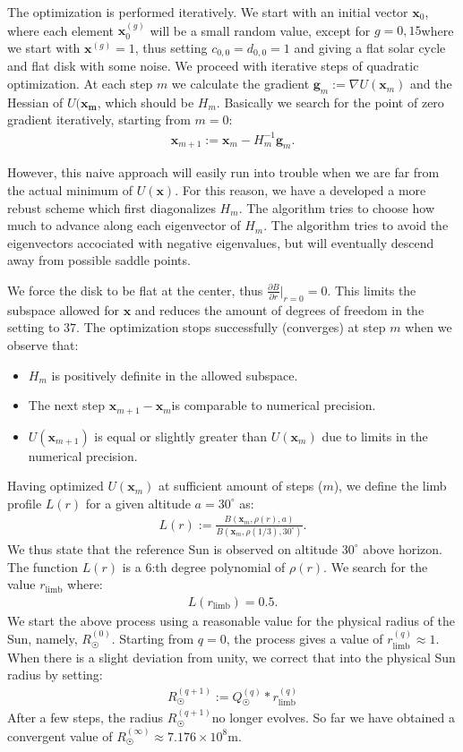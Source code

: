 \documentclass{aa}
\newcommand{\eqnl}[2]{\begin{eqnarray}\label{#1}#2\end{eqnarray}}
\newcommand{\s}[2]{{#1}_{\mathrm{#2}}}
\begin{document}
  The optimization is performed iteratively. We start with an initial vector $\bm{x}_0$, where each element 
  $\bm{x}_0^{(g)}$ will be a small random value, except for $g=0,15$where we start with $\bm{x}^{(g)} = 1$, thus 
  setting $c_{0,0} = d_{0,0} = 1$ and giving a flat solar cycle and flat disk with some noise. We proceed with iterative 
  steps of quadratic optimization. At each step $m$ we calculate the gradient $\bm{g}_m := \nabla U(\bm{x}_m)$ and the Hessian of $U(\bm{x_m}$, which should be $H_m$. Basically we search for the point of zero gradient iteratively, starting from $m=0$:
  \eqnl{physical_radius_step}{
  \bm{x}_{m+1} := \bm{x}_m - H_m^{-1} \bm{g}_m \text{.}
  }

  However, this naive approach will easily run into trouble when we are far from the actual minimum of $U(\bm{x})$. For 
  this reason, we have a developed a more rebust scheme which first diagonalizes $H_m$. The algorithm tries to choose 
  how much to advance along each eigenvector of $H_m$. The algorithm tries to avoid the eigenvectors accociated with 
  negative eigenvalues, but will eventually descend away from possible saddle points.
  
  We force the disk to be flat at the center, thus $\frac{\partial B}{\partial r}\big|_{r=0} = 0$. This limits the 
  subspace allowed for $\bm{x}$ and reduces the amount of degrees of freedom in the setting to $37$. The optimization stops successfully (converges) at step $m$ when we observe that:
  \begin{itemize}
  \item $H_m$ is positively definite in the allowed subspace.
  \item The next step $\bm{x}_{m+1} - \bm{x}_{m}$is comparable to numerical precision.
  \item $U(\bm{x}_{m+1})$ is equal or slightly greater than $U(\bm{x}_m)$ due to limits in the numerical precision.
  \end{itemize}

  Having optimized $U(\bm{x}_{m})$ at sufficient amount of steps ($m$), we define the limb profile $L(r)$ for a given altitude $a = 30^{\circ}$ as:
  \eqnl{physical_radius_limb}{
  L(r) := \frac{B(\bm{x}_m, \rho(r), a)}{B(\bm{x}_m, \rho(1/3), 30^{\circ})} \text{.}
  }
  We thus state that the reference Sun is observed on altitude $30^{\circ}$ above horizon. The function $L(r)$ is a $6$:th degree polynomial of $\rho(r)$. We search for the value $\s{r}{limb}$ where:
  \eqnl{physical_radius_limb2}{
  L(\s{r}{limb}) = 0.5 \text{.}
  }
  We start the above process using a reasonable value for the physical radius of the Sun, namely, $R_{\astrosun}^{(0)}$. 
  Starting from $q=0$, the process gives a value of $\s{r}{limb}^{(q)} \approx 1$. When there is a slight deviation from 
  unity, we correct that into the physical Sun radius by setting:
  \eqnl{physical_radius_iteration}{
  R_{\astrosun}^{(q+1)} := Q_{\astrosun}^{(q)} * \s{r}{limb}^{(q)}
  }
  After a few steps, the radius $R_{\astrosun}^{(q+1)}$no longer evolves. So far we have obtained a convergent value of $R_{\astrosun}^{(\infty)} \approx 7.176 \times 10^8 \mathrm{m}$.
\end{document}

